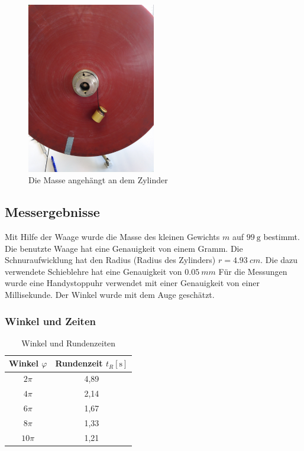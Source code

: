 \documentclass{article}
\begin{document}
			\begin{figure}
				\centering
				\includegraphics[width=0.5\textwidth]{Winkelbeschleunigung.jpg}
				\caption{\label{fig:Angehängte Masse}Die Masse angehängt an dem Zylinder}
			\end{figure}

		\subsection{Messergebnisse}
			Mit Hilfe der Waage wurde die Masse des kleinen Gewichts \(m\) auf \(\SI{99}{\gram}\) bestimmt.
			Die benutzte Waage hat eine Genauigkeit von einem Gramm.
			Die Schnuraufwicklung hat den Radius (Radius des Zylinders) \(r = \SI{4.93}{cm}\).
			Die dazu verwendete Schieblehre hat eine Genauigkeit von \(\SI{0.05}{mm}\) 
			Für die Messungen wurde eine Handystoppuhr verwendet mit einer Genauigkeit von einer Millisekunde.
			Der Winkel wurde mit dem Auge geschätzt. \\

			\subsubsection{Winkel und Zeiten}
				\begin{table}[!h]
					\centering
					\begin{tabular}{ | c | c | } 
						\hline
						Winkel \( \varphi \) & Rundenzeit \(t_R [\unit{\second}]\) \\
						\hline
						\( 2\pi \) & 4,89 \\
						\( 4\pi \) & 2,14 \\
						\( 6\pi \) & 1,67 \\
						\( 8\pi \) & 1,33 \\
						\( 10\pi \) & 1,21 \\
						\hline
					\end{tabular}
					\caption{Winkel und Rundenzeiten}
				\end{table}
				
\end{document}
